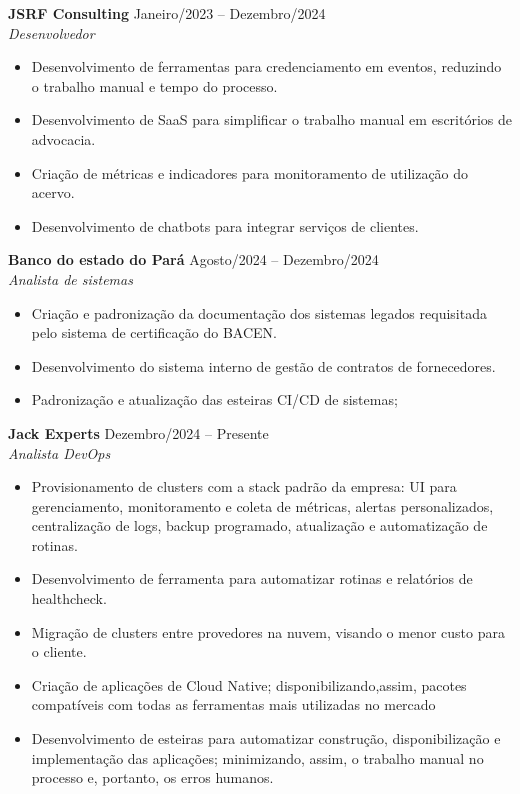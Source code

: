 \documentclass[a4paper,10pt]{article}
\newcommand{\entry}[4]{
  \noindent\textbf{#1} \hfill #2 \\
  \noindent\textit{#3} \hfill \textit{#4} \\
  \vspace{2pt}
}
\begin{document}
\vspace{0.6em}

\entry{JSRF Consulting}{\faCalendar \space Janeiro/2023 -- Dezembro/2024}{Desenvolvedor}
\space
\vspace{-1.6em}
\begin{itemize}
\setlength\itemsep{0em}
\item Desenvolvimento de ferramentas para credenciamento em eventos, reduzindo o trabalho manual e tempo do processo.
\item Desenvolvimento de SaaS para simplificar o trabalho manual em escritórios de advocacia.
\item Criação de métricas e indicadores para monitoramento de utilização do acervo.
\item Desenvolvimento de chatbots para integrar serviços de clientes.
\end{itemize}

\entry{Banco do estado do Pará}{\faCalendar \space Agosto/2024 -- Dezembro/2024}{Analista de sistemas}
\space
\vspace{-1.6em}
\begin{itemize}
\setlength\itemsep{0em}
\item Criação e padronização da documentação dos sistemas legados requisitada pelo sistema de certificação do BACEN.
\item Desenvolvimento do sistema interno de gestão de contratos de fornecedores.
\item Padronização e atualização das esteiras CI/CD de sistemas;
\end{itemize}

\entry{Jack Experts}{\faCalendar \space Dezembro/2024 -- Presente}{Analista DevOps}
\space
\vspace{-1.6em}
\begin{itemize}
\setlength\itemsep{0em}
\item Provisionamento de clusters com a stack padrão da empresa: UI para gerenciamento, monitoramento e coleta de métricas, alertas personalizados, centralização de logs, backup programado, atualização e automatização de rotinas.
\item Desenvolvimento de ferramenta para automatizar rotinas e relatórios de healthcheck.
\item Migração de clusters entre provedores na nuvem, visando o menor custo para o cliente.
\item Criação de aplicações de Cloud Native; disponibilizando,assim, pacotes compatíveis com todas as ferramentas mais utilizadas no mercado
\item Desenvolvimento de esteiras para automatizar construção, disponibilização e implementação das aplicações; minimizando, assim, o trabalho manual no processo e, portanto, os erros humanos.
\end{itemize}
\end{document}
